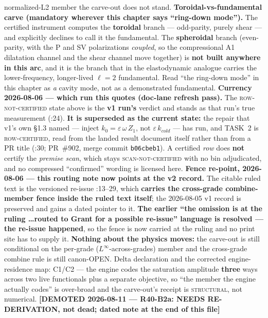 normalized-L2 member the carve-out does not stand. \textbf{Toroidal-vs-fundamental carve (mandatory wherever this chapter says ``ring-down mode'').} The certified instrument computes the \textbf{toroidal} branch --- odd-parity, purely shear --- and explicitly declines to call it the fundamental. The \textbf{spheroidal} branch (even-parity, with the P and SV polarizations \emph{coupled}, so the compressional A1 dilatation channel and the shear channel move together) is \textbf{not built anywhere in this arc}, and it is the branch that in the elastodynamic analogue carries the lower-frequency, longer-lived $\ell = 2$ fundamental. Read ``the ring-down mode'' in this chapter as \emph{a} cavity mode, not as a demonstrated fundamental. \textbf{Currency 2026-08-06 --- which run this quotes (doc-lane refresh pass).} The \textsc{row-not-certified} state above is the \textbf{v1 run's} verdict and stands as that run's true measurement (:24). \textbf{It is superseded as the current state:} the repair that v1's own \S1.3 named --- inject $k_0 = \varepsilon\,\omega\,Z_1$, not $\varepsilon\,k_{cold}$ --- has run, and TASK~2 is \textsc{row-certified}, read from the landed result document itself rather than from a PR title (:30; PR~\#902, merge commit \texttt{b06cbeb1}). A certified \emph{row} does \textbf{not} certify the \emph{premise scan}, which stays \textsc{scan-not-certified} with no bin adjudicated, and no compressed ``confirmed'' wording is licensed here. \textbf{Fence re-point, 2026-08-06 --- this routing note now points at the v2 record.} The citable ruled text is the versioned re-issue :13--29, which \textbf{carries the cross-grade combine-member fence inside the ruled text itself}; the 2026-08-05 v1 record is preserved and gains a dated pointer to it. \textbf{The earlier ``the omission is at the ruling \ldots routed to Grant for a possible re-issue'' language is resolved --- the re-issue happened}, so the fence is now carried at the ruling and no print site has to supply it. \textbf{Nothing about the physics moves:} the carve-out is still conditional on the per-grade ($L^\infty$-across-grades) member and the cross-grade combine rule is still canon-OPEN. Delta declaration and the corrected engine-residence map:  C1/C2 --- the engine codes the saturation amplitude \textbf{three} ways across two live functionals plus a separate objective, so ``the member the engine actually codes'' is over-broad and the carve-out's receipt is \textsc{structural}, not numerical. \textbf{[DEMOTED 2026-08-11 --- R40-B2a: NEEDS RE-DERIVATION, not dead; dated note at the end of this file]}

